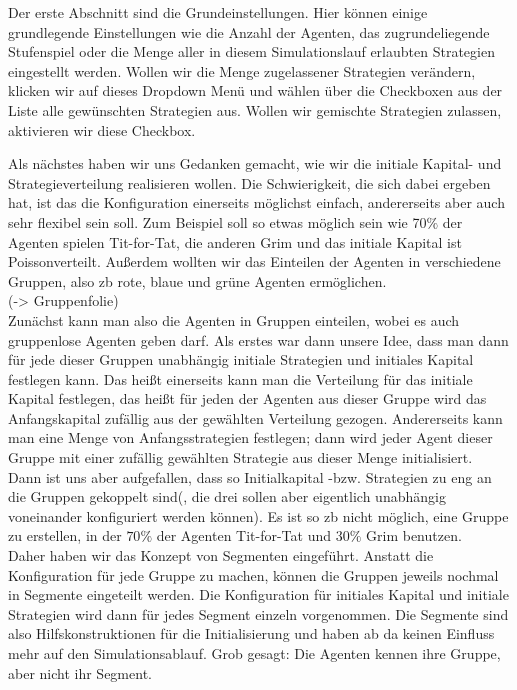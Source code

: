 \documentclass[parskip=full,11pt]{scrartcl}
\begin{document}
Der erste Abschnitt sind die Grundeinstellungen. Hier können einige grundlegende Einstellungen wie die Anzahl der Agenten, das zugrundeliegende Stufenspiel oder die Menge aller in diesem Simulationslauf erlaubten Strategien eingestellt werden. Wollen wir die Menge zugelassener Strategien verändern, klicken wir auf dieses Dropdown Menü und wählen über die Checkboxen aus der Liste alle gewünschten Strategien aus. Wollen wir gemischte Strategien zulassen, aktivieren wir diese Checkbox.

Als nächstes haben wir uns Gedanken gemacht, wie wir die initiale Kapital- und Strategieverteilung realisieren wollen. Die Schwierigkeit, die sich dabei ergeben hat, ist das die Konfiguration einerseits möglichst einfach, andererseits aber auch sehr flexibel sein soll. Zum Beispiel soll so etwas möglich sein wie 70\(\%\) der Agenten spielen Tit-for-Tat, die anderen Grim und das initiale Kapital ist Poissonverteilt.
Außerdem wollten wir das Einteilen der Agenten in verschiedene Gruppen, also zb rote, blaue und grüne Agenten ermöglichen.\\
(-> Gruppenfolie)\\
Zunächst kann man also die Agenten in Gruppen einteilen, wobei es auch gruppenlose Agenten geben darf. Als erstes war dann unsere Idee, dass man dann für jede dieser Gruppen unabhängig initiale Strategien und initiales Kapital festlegen kann. Das heißt einerseits kann man die Verteilung für das initiale Kapital festlegen, das heißt für jeden der Agenten aus dieser Gruppe wird das Anfangskapital zufällig aus der gewählten Verteilung gezogen. Andererseits kann man eine Menge von Anfangsstrategien festlegen; dann wird jeder Agent dieser Gruppe mit einer zufällig gewählten Strategie aus dieser Menge initialisiert.\\
Dann ist uns aber aufgefallen, dass so Initialkapital -bzw. Strategien zu eng an die Gruppen gekoppelt sind(, die drei sollen aber eigentlich unabhängig voneinander konfiguriert werden können). Es ist so zb nicht möglich, eine Gruppe zu erstellen, in der \(70\%\) der Agenten Tit-for-Tat und \(30\%\) Grim benutzen.\\
Daher haben wir das Konzept von Segmenten eingeführt. Anstatt die Konfiguration für jede Gruppe zu machen, können die Gruppen jeweils nochmal in Segmente eingeteilt werden. Die Konfiguration für initiales Kapital und initiale Strategien wird dann für jedes Segment einzeln vorgenommen. Die Segmente sind also Hilfskonstruktionen für die Initialisierung und haben ab da keinen Einfluss mehr auf den Simulationsablauf. Grob gesagt: Die Agenten kennen ihre Gruppe, aber nicht ihr Segment.
\end{document}
